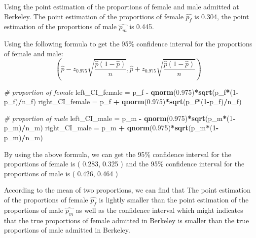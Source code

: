 \documentclass[]{article}
\newenvironment{Shaded}{\begin{snugshade}}{\end{snugshade}}
\newcommand{\KeywordTok}[1]{\textcolor[rgb]{0.13,0.29,0.53}{\textbf{#1}}}
\newcommand{\DecValTok}[1]{\textcolor[rgb]{0.00,0.00,0.81}{#1}}
\newcommand{\FloatTok}[1]{\textcolor[rgb]{0.00,0.00,0.81}{#1}}
\newcommand{\StringTok}[1]{\textcolor[rgb]{0.31,0.60,0.02}{#1}}
\newcommand{\CommentTok}[1]{\textcolor[rgb]{0.56,0.35,0.01}{\textit{#1}}}
\newcommand{\OperatorTok}[1]{\textcolor[rgb]{0.81,0.36,0.00}{\textbf{#1}}}
\newcommand{\NormalTok}[1]{#1}
\begin{document}
Using the point estimation of the proportions of female and male
admitted at Berkeley. The point estimation of the proportions of female
\(\hat{p_f}\) is 0.304, the point estimation of the proportions of male
\(\hat{p_m}\) is 0.445.

Using the following formula to get the 95\% confidence interval for the
proportions of female and male:
\[ \left(\hat{p}-z_{0.975}\sqrt{\frac{\hat{p}(1-\hat{p})}{n}},\hat{p}+z_{0.975}\sqrt{\frac{\hat{p}(1-\hat{p})}{n}}\right) \]

\begin{Shaded}
\begin{Highlighting}[]
\CommentTok{# proportion of female}
\NormalTok{left_CI_female =}\StringTok{ }\NormalTok{p_f }\OperatorTok{-}\StringTok{ }\KeywordTok{qnorm}\NormalTok{(}\FloatTok{0.975}\NormalTok{)}\OperatorTok{*}\KeywordTok{sqrt}\NormalTok{(p_f}\OperatorTok{*}\NormalTok{(}\DecValTok{1}\OperatorTok{-}\NormalTok{p_f)}\OperatorTok{/}\NormalTok{n_f)}
\NormalTok{right_CI_female =}\StringTok{ }\NormalTok{p_f }\OperatorTok{+}\StringTok{ }\KeywordTok{qnorm}\NormalTok{(}\FloatTok{0.975}\NormalTok{)}\OperatorTok{*}\KeywordTok{sqrt}\NormalTok{(p_f}\OperatorTok{*}\NormalTok{(}\DecValTok{1}\OperatorTok{-}\NormalTok{p_f)}\OperatorTok{/}\NormalTok{n_f)}

\CommentTok{# proportion of male}
\NormalTok{left_CI_male =}\StringTok{ }\NormalTok{p_m }\OperatorTok{-}\StringTok{ }\KeywordTok{qnorm}\NormalTok{(}\FloatTok{0.975}\NormalTok{)}\OperatorTok{*}\KeywordTok{sqrt}\NormalTok{(p_m}\OperatorTok{*}\NormalTok{(}\DecValTok{1}\OperatorTok{-}\NormalTok{p_m)}\OperatorTok{/}\NormalTok{n_m)}
\NormalTok{right_CI_male =}\StringTok{ }\NormalTok{p_m }\OperatorTok{+}\StringTok{ }\KeywordTok{qnorm}\NormalTok{(}\FloatTok{0.975}\NormalTok{)}\OperatorTok{*}\KeywordTok{sqrt}\NormalTok{(p_m}\OperatorTok{*}\NormalTok{(}\DecValTok{1}\OperatorTok{-}\NormalTok{p_m)}\OperatorTok{/}\NormalTok{n_m)}
\end{Highlighting}
\end{Shaded}

By using the above formula, we can get the 95\% confidence interval for
the proportions of female is ( 0.283, 0.325 ) and the 95\% confidence
interval for the proportions of male is ( 0.426, 0.464 )

According to the mean of two proportions, we can find that The point
estimation of the proportions of female \(\hat{p_f}\) is lightly smaller
than the point estimation of the proportions of male \(\hat{p_m}\) as
well as the confidence interval which might indicates that the true
proportions of female admitted in Berkeley is smaller than the true
proportions of male admitted in Berkeley.
\end{document}
